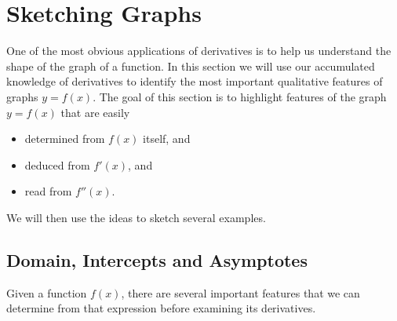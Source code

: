 \section{Sketching Graphs}\label{sec curve sketch}
One of the most obvious applications of derivatives is to help us understand the shape of
the graph of a function. In this section we will use our accumulated knowledge of
derivatives to identify the most important qualitative features of graphs $y=f(x)$. The
goal of this section is to highlight features of the graph $y=f(x)$ that are easily
\begin{itemize}
\item determined from $f(x)$ itself, and

\item deduced from $f'(x)$, and

\item read from $f''(x)$.
\end{itemize}
We will then use the ideas to sketch several examples.
\subsection{Domain, Intercepts and Asymptotes}\label{ssec_sketch_DIA}
Given a function $f(x)$, there are several important features that we can determine from
that expression before examining its derivatives.

